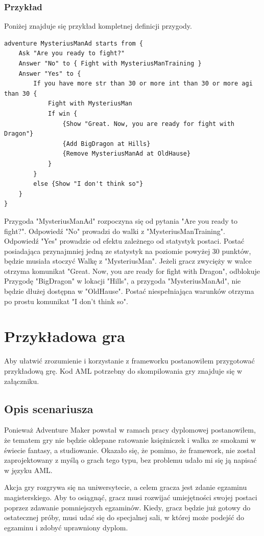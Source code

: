 \documentclass	{xmgr}
\begin{document}
\subsection*{Przykład}
Poniżej znajduje się przykład kompletnej definicji przygody.
\begin{lstlisting}
adventure MysteriusManAd starts from {
	Ask "Are you ready to fight?"
	Answer "No" to { Fight with MysteriusManTraining }
	Answer "Yes" to {
		If you have more str than 30 or more int than 30 or more agi than 30 {
			Fight with MysteriusMan
			If win {
				{Show "Great. Now, you are ready for fight with Dragon"}
				{Add BigDragon at Hills}
				{Remove MysteriusManAd at OldHause}
			}
		}
		else {Show "I don't think so"}
	}
}
\end{lstlisting}
Przygoda "MysteriusManAd" rozpoczyna się od pytania "Are you ready to fight?". Odpowiedź "No" prowadzi do walki z "MysteriusManTraining".
Odpowiedź "Yes" prowadzie od efektu zależnego od statystyk postaci. Postać posiadająca przynajmniej jedną ze statystyk na poziomie powyżej 30 punktów, będzie musiała stoczyć Walkę z "MysteriusMan". Jeżeli gracz zwycięży w walce otrzyma komunikat "Great. Now, you are ready for fight with Dragon", odblokuje Przygodę "BigDragon" w lokacji "Hills", a przygoda "MysteriusManAd", nie będzie dłużej dostępna w "OldHause". Postać niespełniająca warunków otrzyma po prostu komunikat "I don't think so". 

\chapter{Przykładowa gra}
Aby ułatwić zrozumienie i korzystanie z frameworku postanowiłem przygotować przykładową grę. Kod AML potrzebny do skompilowania gry znajduje się w załączniku.

\section{Opis scenariusza}

Ponieważ Adventure Maker powstał w ramach pracy dyplomowej postanowiłem, że tematem gry nie będzie oklepane ratowanie księżniczek i walka ze smokami w świecie fantasy, a studiowanie. Okazało się, że pomimo, że framework, nie został zaprojektowany z myślą o grach tego typu, bez problemu udało mi się ją napisać w języku AML.

Akcja gry rozgrywa się na uniwersytecie, a celem gracza jest zdanie egzaminu magisterskiego. Aby to osiągnąć, gracz musi rozwijać umiejętności swojej postaci poprzez zdawanie pomniejszych egzaminów. Kiedy, gracz będzie już gotowy do ostatecznej próby, musi udać się do specjalnej sali, w której może podejść do egzaminu i zdobyć uprawniony dyplom.
\end{document}
